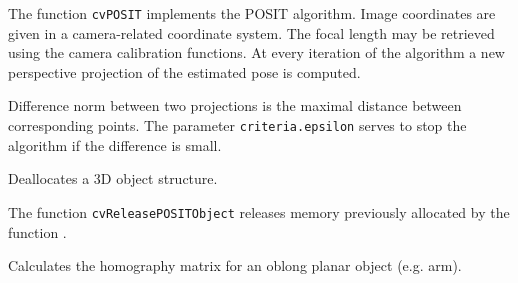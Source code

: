 \begin{description}
\end{description}

The function \texttt{cvPOSIT} implements the POSIT algorithm. Image coordinates are given in a camera-related coordinate system. The focal length may be retrieved using the camera calibration functions. At every iteration of the algorithm a new perspective projection of the estimated pose is computed.

Difference norm between two projections is the maximal distance between corresponding points. The parameter \texttt{criteria.epsilon} serves to stop the algorithm if the difference is small.

\label{ReleasePOSITObject}

Deallocates a 3D object structure.


\begin{description}
\end{description}

The function \texttt{cvReleasePOSITObject} releases memory previously allocated by the function .


\label{CalcImageHomography}

Calculates the homography matrix for an oblong planar object (e.g. arm).


\begin{description}
\end{description}

